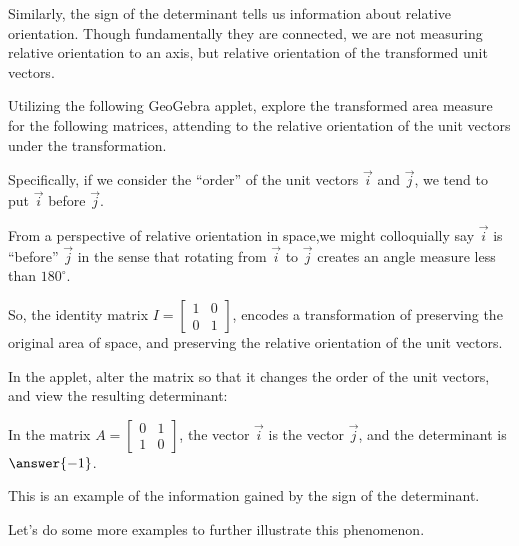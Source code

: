 \documentclass{ximera}
\begin{document}
Similarly, the sign of the determinant tells us information about relative orientation. Though fundamentally they are connected, we are not measuring relative orientation to an axis, but relative orientation of the transformed unit vectors. 

\begin{example}
    Utilizing the following GeoGebra applet, explore the transformed area measure for the following matrices, attending to the relative orientation of the unit vectors under the transformation.

    Specifically, if we consider the ``order'' of the unit vectors $\vec{i}$ and $\vec{j}$, we tend to put $\vec{i}$ before $\vec{j}$. 


    \begin{center}
    \end{center}
    
    From a perspective of relative orientation in space,we might colloquially say $\vec{i}$ is ``before'' $\vec{j}$ in the sense that rotating from $\vec{i}$ to $\vec{j}$ creates an angle measure less than $180^\circ$.

    So, the identity matrix $I=\begin{bmatrix}
        1&0\\0&1
    \end{bmatrix}$, encodes a transformation of preserving the original area of space, and preserving the relative orientation of the unit vectors. 

    In the applet, alter the matrix so that it changes the order of the unit vectors, and view the resulting determinant:

    In the matrix $A=\begin{bmatrix}
        0&1\\1&0
    \end{bmatrix}$, the vector $\vec{i}$ is 
    the vector $\vec{j}$, and the determinant is $\answer{-1}$.

    This is an example of the information gained by the sign of the determinant.

\end{example}

Let's do some more examples to further illustrate this phenomenon. 
\end{document}
